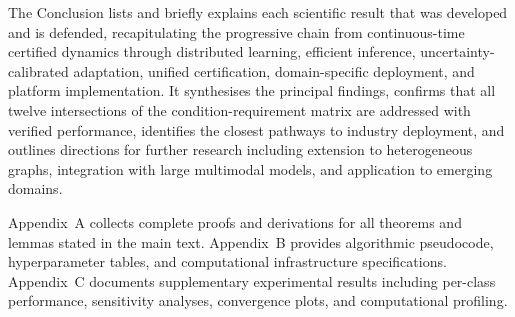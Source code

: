 The Conclusion lists and briefly explains each scientific result that was developed and is defended, recapitulating the progressive chain from continuous-time certified dynamics through distributed learning, efficient inference, uncertainty-calibrated adaptation, unified certification, domain-specific deployment, and platform implementation. It synthesises the principal findings, confirms that all twelve intersections of the condition-requirement matrix are addressed with verified performance, identifies the closest pathways to industry deployment, and outlines directions for further research including extension to heterogeneous graphs, integration with large multimodal models, and application to emerging domains.

Appendix~A collects complete proofs and derivations for all theorems and lemmas stated in the main text. Appendix~B provides algorithmic pseudocode, hyperparameter tables, and computational infrastructure specifications. Appendix~C documents supplementary experimental results including per-class performance, sensitivity analyses, convergence plots, and computational profiling.


